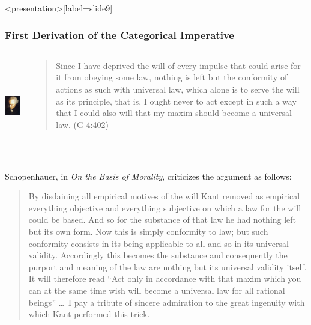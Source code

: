 % 

\begin{frame}<presentation>[label=slide9]
    \frametitle{First Derivation of the Categorical Imperative}
        \begin{columns}
            \begin{column}{3cm}
                \includegraphics[height=4cm]{../../../graphics/kant.jpg}
            \end{column}
            \begin{column}{7cm}
                \begin{quote}
                	Since I have deprived the will of every impulse that could arise for it from obeying some law, nothing is left but the conformity of actions as such with universal law, which alone is to serve the will as its principle, that is, I ought never to act except in such a way that I could also will that my maxim should become a universal law. (G 4:402)
                \end{quote}
            \end{column}
        \end{columns}
\end{frame}

Schopenhauer, in \emph{On the Basis of Morality}, criticizes the argument as follows:

\begin{quote}
	By disdaining all empirical motives of the will Kant removed as empirical everything objective and everything subjective on which a law for the will could be based. And so for the substance of that law he had nothing left but its own form. Now this is simply conformity to law; but such conformity consists in its being applicable to all and so in its universal validity. Accordingly this becomes the substance and consequently the purport and meaning of the law are nothing but its universal validity itself. It will therefore read ``Act only in accordance with that maxim which you can at the same time wish will become a universal law for all rational beings'' \ldots\ I pay a tribute of sincere admiration to the great ingenuity with which Kant performed this trick.
\end{quote}


